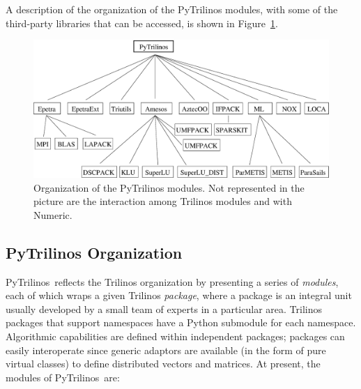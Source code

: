 \documentclass[acmtocl]{acmtrans2m}
\newcommand{\PyTrilinos}{{PyTrilinos}}
\begin{document}
A description of the organization of the 
PyTrilinos modules, with some of the third-party libraries that can be
accessed, is shown in Figure~\ref{fig:organization}.

\begin{figure}
\begin{center}
\includegraphics[width=12cm]{organization.eps}
\caption{Organization of the PyTrilinos modules. Not represented in the
  picture are the interaction among Trilinos modules and with Numeric.}
\label{fig:organization}
\end{center}
\end{figure}

\subsection{PyTrilinos Organization}
\label{sec:organization}

\PyTrilinos\ reflects the Trilinos organization by presenting a series
of {\sl modules}, each of which wraps a given Trilinos {\sl package},
where a package is an integral unit usually developed by a small team
of experts in a particular area.  Trilinos packages that support
namespaces have a Python submodule for each namespace.  Algorithmic
capabilities are defined within independent packages;
packages can easily interoperate since generic adaptors are available
(in the form of pure virtual classes) to define distributed vectors and
matrices.
At present, the modules of \PyTrilinos\ are:
\end{document}
